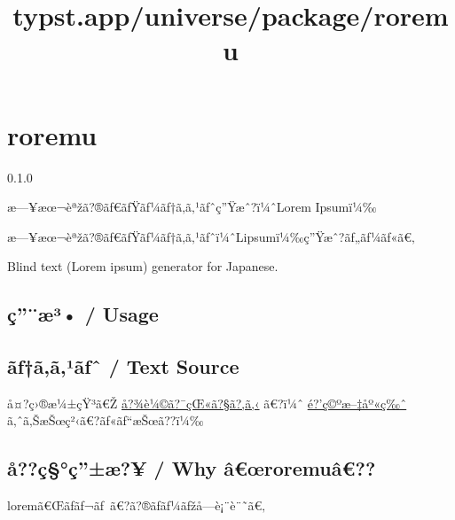 \title{typst.app/universe/package/roremu}

\label{banner}
\section{roremu}\label{roremu}

{ 0.1.0 }

æ---¥æœ¬èªžã?®ãƒ€ãƒŸãƒ¼ãƒ†ã‚­ã‚¹ãƒˆç''Ÿæˆ?ï¼ˆLorem Ipsumï¼‰

\label{readme}
æ---¥æœ¬èªžã?®ãƒ€ãƒŸãƒ¼ãƒ†ã‚­ã‚¹ãƒˆï¼ˆLipsumï¼‰ç''Ÿæˆ?ãƒ„ãƒ¼ãƒ«ã€‚

Blind text (Lorem ipsum) generator for Japanese.

\subsection{ç''¨æ³• / Usage}\label{uxe7uxe6uxb3-usage}

\begin{Shaded}
\begin{Highlighting}[]



\end{Highlighting}
\end{Shaded}

\subsection{ãƒ†ã‚­ã‚¹ãƒˆ / Text
Source}\label{uxe3ux192uxe3uxe3uxb9uxe3ux192ux2c6-text-source}

å¤?ç›®æ¼±çŸ³ã€Ž
\href{https://ja.wikipedia.org/wiki/\%E5\%90\%BE\%E8\%BC\%A9\%E3\%81\%AF\%E7\%8C\%AB\%E3\%81\%A7\%E3\%81\%82\%E3\%82\%8B}{å?¾è¼©ã?¯çŒ«ã?§ã?‚ã‚‹}
ã€?ï¼ˆ
\href{https://www.aozora.gr.jp/cards/000148/card789.html}{é?'ç©ºæ--‡åº«ç‰ˆ}
ã‚ˆã‚ŠæŠœç²‹ã€?ãƒ«ãƒ``æŠœã??ï¼‰

\subsection{å??ç§°ç''±æ?¥ / Why
â€œroremuâ€??}\label{uxe5uxe7uxe7uxe6-why-uxe2ux153roremuuxe2}

loremã€Œãƒ­ãƒ¬ãƒ~ã€?ã?®ãƒ­ãƒ¼ãƒžå­---è¡¨è¨˜ã€‚

